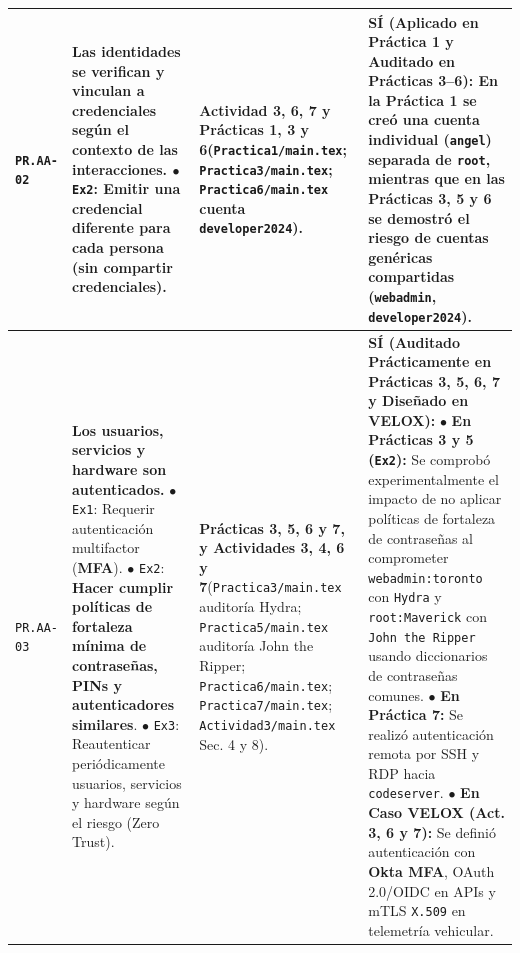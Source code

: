 \documentclass[letterpaper,11pt]{article}
\begin{document}
\begin{longtable}{|C{1.5cm}|L{5.3cm}|L{4.3cm}|L{5.8cm}|}
\texttt{PR.AA-02} &
\textbf{Las identidades se verifican y vinculan a credenciales según el contexto de las interacciones.}\newline
$\bullet$ \texttt{Ex2}: Emitir una credencial diferente para cada persona (sin compartir credenciales). &
\textbf{Actividad 3, 6, 7 y Prácticas 1, 3 y 6}\newline (\texttt{Practica1/main.tex}; \texttt{Practica3/main.tex}; \texttt{Practica6/main.tex} cuenta \texttt{developer2024}). &
\textbf{SÍ (Aplicado en Práctica 1 y Auditado en Prácticas 3--6):}\newline
En la Práctica 1 se creó una cuenta individual (\texttt{angel}) separada de \texttt{root}, mientras que en las Prácticas 3, 5 y 6 se demostró el riesgo de cuentas genéricas compartidas (\texttt{webadmin}, \texttt{developer2024}). \\
\hline

\texttt{PR.AA-03} &
\textbf{Los usuarios, servicios y hardware son autenticados.}\newline
$\bullet$ \texttt{Ex1}: Requerir autenticación multifactor (\textbf{MFA}).\newline
$\bullet$ \texttt{Ex2}: \textbf{Hacer cumplir políticas de fortaleza mínima de contraseñas, PINs y autenticadores similares}.\newline
$\bullet$ \texttt{Ex3}: Reautenticar periódicamente usuarios, servicios y hardware según el riesgo (Zero Trust). &
\textbf{Prácticas 3, 5, 6 y 7, y Actividades 3, 4, 6 y 7}\newline (\texttt{Practica3/main.tex} auditoría Hydra; \texttt{Practica5/main.tex} auditoría John the Ripper; \texttt{Practica6/main.tex}; \texttt{Practica7/main.tex}; \texttt{Actividad3/main.tex} Sec. 4 y 8). &
\textbf{SÍ (Auditado Prácticamente en Prácticas 3, 5, 6, 7 y Diseñado en VELOX):}\newline
$\bullet$ \textbf{En Prácticas 3 y 5 (\texttt{Ex2}):} Se comprobó experimentalmente el impacto de no aplicar políticas de fortaleza de contraseñas al comprometer \texttt{webadmin:toronto} con \texttt{Hydra} y \texttt{root:Maverick} con \texttt{John the Ripper} usando diccionarios de contraseñas comunes.\newline
$\bullet$ \textbf{En Práctica 7:} Se realizó autenticación remota por SSH y RDP hacia \texttt{codeserver}.\newline
$\bullet$ \textbf{En Caso VELOX (Act. 3, 6 y 7):} Se definió autenticación con \textbf{Okta MFA}, OAuth 2.0/OIDC en APIs y mTLS \texttt{X.509} en telemetría vehicular. \\
\hline


\end{longtable}
\end{document}
